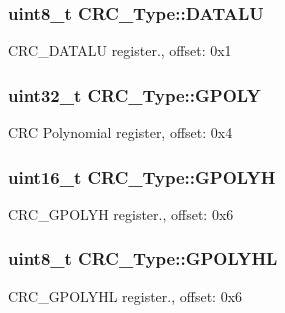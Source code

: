 \subsubsection[{\texorpdfstring{D\+A\+T\+A\+LU}{DATALU}}]{ uint8\+\_\+t C\+R\+C\+\_\+\+Type\+::\+D\+A\+T\+A\+LU}\hypertarget{structCRC__Type_abef76ff6106ba6495032c35b2e89cd87}{}\label{structCRC__Type_abef76ff6106ba6495032c35b2e89cd87}
C\+R\+C\+\_\+\+D\+A\+T\+A\+LU register., offset\+: 0x1 
\subsubsection[{\texorpdfstring{G\+P\+O\+LY}{GPOLY}}]{ uint32\+\_\+t C\+R\+C\+\_\+\+Type\+::\+G\+P\+O\+LY}\hypertarget{structCRC__Type_ab020842ee7d3106b47d3d9ca434ea824}{}\label{structCRC__Type_ab020842ee7d3106b47d3d9ca434ea824}
C\+RC Polynomial register, offset\+: 0x4 
\subsubsection[{\texorpdfstring{G\+P\+O\+L\+YH}{GPOLYH}}]{ uint16\+\_\+t C\+R\+C\+\_\+\+Type\+::\+G\+P\+O\+L\+YH}\hypertarget{structCRC__Type_a19ca0a95160df83c2ce3909cf98907f7}{}\label{structCRC__Type_a19ca0a95160df83c2ce3909cf98907f7}
C\+R\+C\+\_\+\+G\+P\+O\+L\+YH register., offset\+: 0x6 
\subsubsection[{\texorpdfstring{G\+P\+O\+L\+Y\+HL}{GPOLYHL}}]{ uint8\+\_\+t C\+R\+C\+\_\+\+Type\+::\+G\+P\+O\+L\+Y\+HL}\hypertarget{structCRC__Type_a867562348da603502f06b4afe663b1d8}{}\label{structCRC__Type_a867562348da603502f06b4afe663b1d8}
C\+R\+C\+\_\+\+G\+P\+O\+L\+Y\+HL register., offset\+: 0x6 
